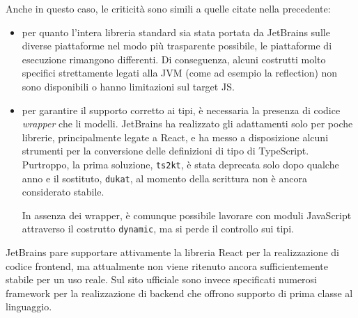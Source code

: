       Anche in questo caso, le criticità sono simili a quelle citate nella  precedente:
      \begin{itemize}
        \item
          per quanto l'intera libreria standard sia stata portata da JetBrains sulle diverse piattaforme nel modo più trasparente possibile, le piattaforme di esecuzione rimangono differenti.
          Di conseguenza, alcuni costrutti molto specifici strettamente legati alla JVM (come ad esempio la reflection) non sono disponibili o hanno limitazioni sul target JS\@.
        \item
          per garantire il supporto corretto ai tipi, è necessaria la presenza di codice \emph{wrapper} che li modelli.
          JetBrains ha realizzato gli adattamenti solo per poche librerie, principalmente legate a React, e ha messo a disposizione alcuni strumenti per la conversione delle definizioni di tipo di TypeScript.
          Purtroppo, la prima soluzione, \texttt{ts2kt}, è stata deprecata solo dopo qualche anno e il sostituto, \texttt{dukat}, al momento della scrittura non è ancora considerato stabile.

          In assenza dei wrapper, è comunque possibile lavorare con moduli JavaScript attraverso il costrutto \texttt{dynamic}, ma si perde il controllo sui tipi.
      \end{itemize}

      JetBrains pare supportare attivamente la libreria React per la realizzazione di codice frontend, ma attualmente non viene ritenuto ancora sufficientemente stabile per un uso reale.
      Sul sito ufficiale sono invece specificati numerosi framework per la realizzazione di backend che offrono supporto di prima classe al linguaggio.
